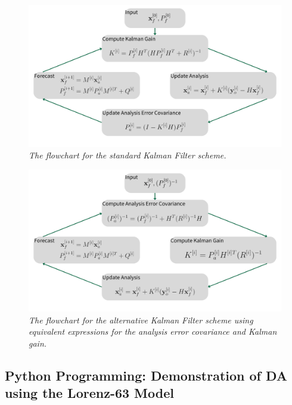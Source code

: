\begin{landscape}
\begin{figure}
    \centering
    \includegraphics[width=0.9\linewidth]{graphics/Kalman1.png}
    \caption{\textit{The flowchart for the standard Kalman Filter scheme.}}
    \label{fig:Kalmansteps}
\end{figure}
\end{landscape}
\begin{landscape}
\begin{figure}
    \centering
    \includegraphics[width=0.9\linewidth]{graphics/Kalman2.png}
    \caption{\textit{The flowchart for the alternative Kalman Filter scheme using equivalent expressions for the analysis error covariance and Kalman gain.}}
    \label{fig:Kalmansteps2}
\end{figure}
\end{landscape}

\subsection{Python Programming: Demonstration of DA using the Lorenz-63 Model}
\label{subsection:DAsystem}

